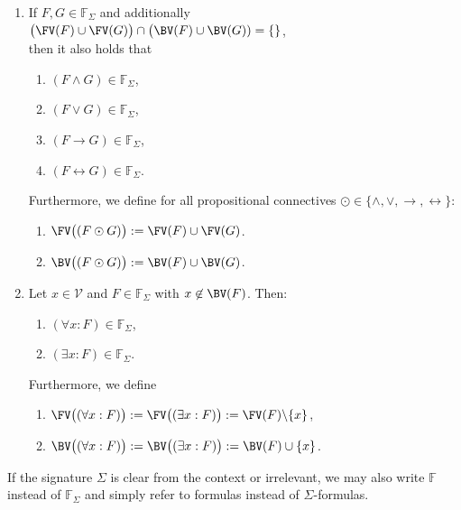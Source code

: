 \begin{Definition}
\begin{enumerate}
\begin{enumerate}
          \item $\FV\bigl( \neg F \bigr) := \FV(F)$,
          \item $\BV\bigl( \neg F \bigr) := \BV(F)$.
          \end{enumerate}
    \item If $F, G \in \mathbb{F}_\Sigma$ and additionally \\[0.2cm]
          \hspace*{1.3cm}
          $\bigl(\FV(F) \cup \FV(G)\bigr) \cap \bigl(\BV(F) \cup \BV(G)) = \{\}$,
          \\[0.2cm]
          then it also holds that
          \begin{enumerate}
          \item $(F \wedge G) \in \mathbb{F}_\Sigma$,
          \item $(F \vee G) \in \mathbb{F}_\Sigma$,
          \item $(F \rightarrow G) \in \mathbb{F}_\Sigma$,
          \item $(F \leftrightarrow G) \in \mathbb{F}_\Sigma$.
          \end{enumerate}
          Furthermore, we define for all propositional connectives $\odot \in \{ \wedge, \vee, \rightarrow, \leftrightarrow \}$:
          \begin{enumerate}
          \item $\FV\bigl((F \odot G) \bigr) := \FV(F) \cup \FV(G)$.
          \item $\BV\bigl((F \odot G) \bigr) := \BV(F) \cup \BV(G)$.
          \end{enumerate}
    \item Let $x \in \mathcal{V}$ and $F \in \mathbb{F}_\Sigma$ with $x \not\in \BV(F)$. Then:
          \begin{enumerate}
          \item $(\forall x : F) \in \mathbb{F}_\Sigma$,
          \item $(\exists x : F) \in \mathbb{F}_\Sigma$.
          \end{enumerate}
          Furthermore, we define
          \begin{enumerate}
          \item $\FV\bigl( (\forall x : F) \bigr) := \FV\bigl( (\exists x : F) \bigr) := \FV(F) \backslash \{x\}$,
          \item $\BV\bigl( (\forall x : F) \bigr) := \BV\bigl( (\exists x : F) \bigr) := \BV(F) \cup \{x\}$.  
          \end{enumerate}
    \end{enumerate}
    If the signature $\Sigma$ is clear from the context or irrelevant, we may also write
    $\mathbb{F}$ instead of $\mathbb{F}_\Sigma$ and simply refer to formulas instead of $\Sigma$-formulas.
    \eox
\end{Definition}

